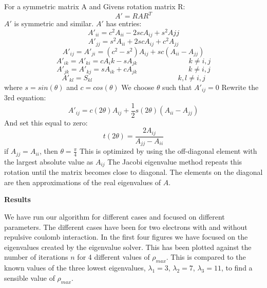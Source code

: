 \documentclass[10pt,a4paper]{article}
\begin{document}
\noindent For a symmetric matrix A and Givens rotation matrix R:
$$A'=RAR^T$$
$A'$ is symmetric and similar. $A'$ has entries:
$$A'_{ii} = c^2A_{ii}-2scA_{ij}+s^2A{jj}$$
$$A'_{jj} = s^2A_{ii}+2scA_{ij}+c^2A_{jj}$$
$$A'_{ij} = A'_{ji} = (c^2-s^2)A_{ij}+sc(A_{ii}-A_{jj})$$
$$A'_{ik}=A'_{ki}=cA_ik-sA_{jk} \hspace{3cm} k\neq i,j$$
$$A'_{jk} = A'_{kj} = sA_{ik}+cA_{jk} \hspace{3cm} k\neq i,j$$
$$A'_{kl} = S_{kl} \hspace{5cm} k,l \neq i,j$$
where $s=sin(\theta)$ and $c=cos(\theta)$
We choose $\theta$ such that $A'_{ij}=0$
Rewrite the 3rd equation:
$$A'_{ij}=c(2\theta)A_{ij}+\frac{1}{2}s(2\theta)(A_{ii}-A_{jj})$$
And set this equal to zero:
$$t(2\theta)=\frac{2A_{ij}}{A_{jj}-A_{ii}}$$
if $A_{jj}=A_{ii}$, then $\theta=\frac{\pi}{4}$
This is optimized by using the off-diagonal element with the largest absolute value as $A_{ij}$
The Jacobi eigenvalue method repeats this rotation until the matrix becomes close to diagonal. The elements on the diagonal are then approximations of the real eigenvalues of $A$.


\newpage

\begin{center}
{\LARGE\bf Results}
\end{center}
We have run our algorithm for different cases and focused on different parameters. The different cases have been for two electrons with and without repulsive coulomb interaction. In the first four figures we have focused on the eigenvalues created by the eigenvalue solver. This has been plotted against the number of iterations $n$ for 4 different values of ${\rho}_{max}$. This is compared to the known values of the three lowest eigenvalues, $\lambda_1=3$, $\lambda_2=7$, $\lambda_3=11$, to find a sensible value of ${\rho}_{max}$. 
\end{document}
